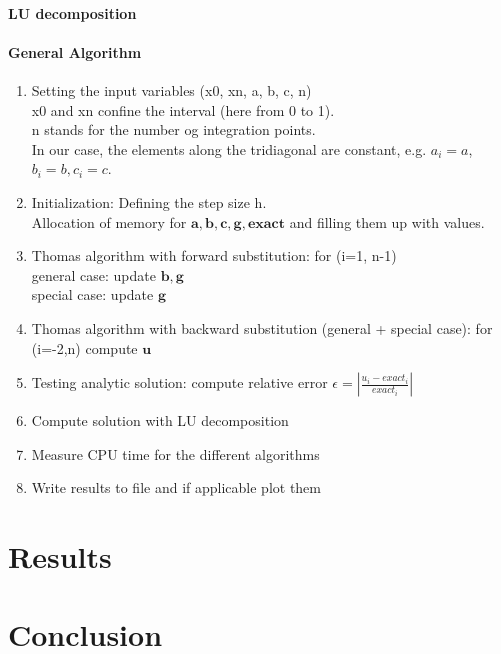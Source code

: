 \documentclass[%
oneside,                 %
final,                   %
10pt]{article}
\begin{document}
\paragraph{LU decomposition}

\paragraph{General Algorithm}
\begin{enumerate}
\item Setting the input variables (x0, xn, a, b, c, n) \\
	x0 and xn confine the interval (here from 0 to 1). \\
	n stands for the number og integration points. \\
	In our case, the elements along the tridiagonal are constant, e.g. $a_i=a$, $b_i=b, c_i=c$.

\item Initialization: Defining the step size h. \\
	Allocation of memory for $ \mathbf{a}, \mathbf{b}, \mathbf{c}, \mathbf{g}, \mathbf{exact}$  and filling them up with values.

\item Thomas algorithm with forward substitution: for (i=1, n-1)\\
	general case: update $\mathbf{b}, \mathbf{g}$ \\
	special case: update $\mathbf{g}$

\item Thomas algorithm with backward substitution (general + special case): for (i=-2,n) compute $\mathbf{u}$

\item Testing analytic solution: compute relative error $  \epsilon =  \left\lvert \frac{u_i-exact_i}{exact_i} \right\rvert$

\item Compute solution with LU decomposition

\item Measure CPU time for the different algorithms

\item Write results to file and if applicable plot them
\end{enumerate}


\section{Results}


\section{Conclusion}











\end{document}
